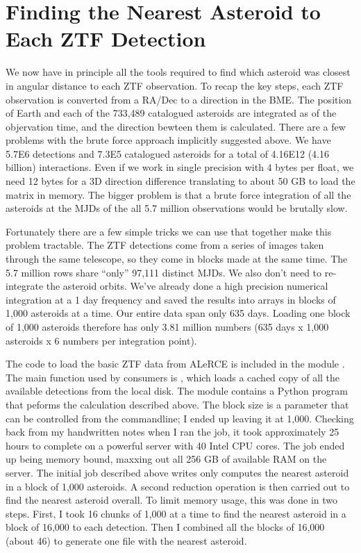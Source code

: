 \section{Finding the Nearest Asteroid to Each ZTF Detection}
\label{section_ztf_nearest_ast}
We now have in principle all the tools required to find which asteroid was closest in angular distance to each ZTF observation.
To recap the key steps, each ZTF observation is converted from a RA/Dec to a direction in the BME.
The position of Earth and each of the 733,489 catalogued asteroids are integrated as of the objervation time, and the direction bewteen them is calculated.
There are a few problems with the brute force approach implicitly suggested above.
We have 5.7E6 detections and 7.3E5 catalogued asteroids for a total of 4.16E12 (4.16 billion) interactions.
Even if we work in single precision with 4 bytes per float, we need 12 bytes for a 3D direction difference translating to about 50 GB to load the matrix in memory.
The bigger problem is that a brute force integration of all the asteroids at the MJDs of the all 5.7 million observations would be brutally slow.

Fortunately there are a few simple tricks we can use that together make this problem tractable.
The ZTF detections come from a series of images taken through the same telescope, so they come in blocks made at the same time.
The 5.7 million rows share ``only'' 97,111 distinct MJDs.
We also don't need to re-integrate the asteroid orbits.
We've already done a high precision numerical integration at a 1 day frequency and saved the results into  arrays in blocks of 1,000 asteroids at a time.
Our entire data span only 635 days.  
Loading one block of 1,000 asteroids therefore has only 3.81 million numbers (635 days x 1,000 asteroids x 6 numbers per integration point).

The code to load the basic ZTF data from ALeRCE is included in the module .
The main function used by consumers is , which loads a cached copy of all the available detections from the local disk.
The module  contains a Python program that peforms the calculation described above.
The block size is a parameter that can be controlled from the commandline; I ended up leaving it at 1,000.
Checking back from my handwritten notes when I ran the job, it took approximately 25 hours to complete on a powerful server with 40 Intel CPU cores.
The job ended up being memory bound, maxxing out all 256 GB of available RAM on the server.
The initial job described above writes only computes the nearest asteroid in a block of 1,000 asteroids.
A second reduction operation is then carried out to find the nearest asteroid overall.
To limit memory usage, this was done in two steps.
First, I took 16 chunks of 1,000 at a time to find the nearest asteroid in a block of 16,000 to each detection.
Then I combined all the blocks of 16,000 (about 46) to generate one file with the nearest asteroid.


